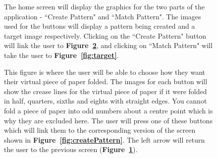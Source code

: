 \documentclass[11pt]{article}
\begin{document}
\begin{figure}
\begin{minipage}[c]{0.35\textwidth}
                \end{minipage}\hfill
                \begin{minipage}[c]{0.65\textwidth}
                \caption{The home screen will display the graphics for the two parts of the application - ``Create Pattern" and ``Match Pattern". The images used for the buttons will display a pattern being created and a target image respectively. Clicking on the ``Create Pattern" button will link the user to \textbf{Figure~\ref{fig:chooseFold}}, and clicking on ``Match Pattern" will take the user to \textbf{Figure~\ref{fig:target}}.}
                \label{fig:homeScreen}
                \end{minipage}
            \end{figure}
            \begin{figure}
                \begin{minipage}[c]{0.65\textwidth}
                \caption{This figure is where the user will be able to choose how they want their virtual piece of paper folded. The images for each button will show the crease lines for the virtual piece of paper if it were folded in half, quarters, sixths and eights with straight edges. You cannot fold a piece of paper into odd numbers about a centre point which is why they are excluded here. The user will press one of these buttons which will link them to the corresponding version of the screen shown in \textbf{Figure~\ref{fig:createPattern}}. The left arrow will return the user to the previous screen (\textbf{Figure~\ref{fig:homeScreen}}).}
                \label{fig:chooseFold}
                \end{minipage}\hfill
                \begin{minipage}[c]{0.35\textwidth}

\end{minipage}
\end{figure}
\end{document}
